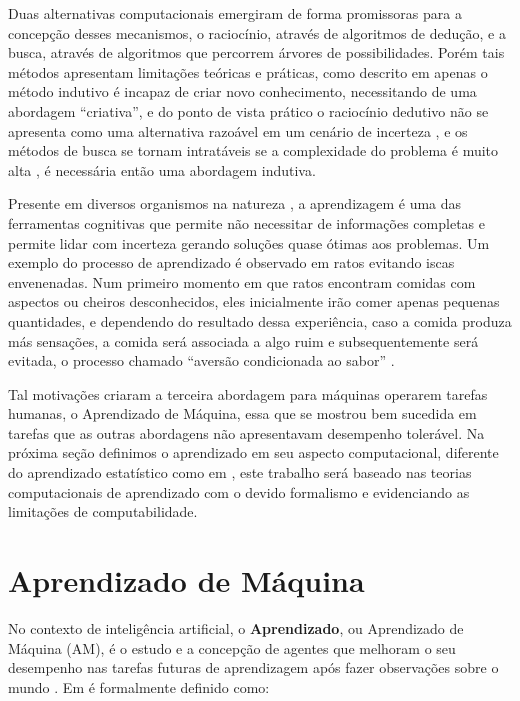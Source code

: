 Duas alternativas computacionais emergiram de forma promissoras para a concepção desses mecanismos, o raciocínio, através de algoritmos de dedução, e a busca, através de algoritmos que percorrem árvores de possibilidades. Porém tais métodos apresentam limitações teóricas e práticas, como descrito em \cite{popper2005logic} apenas o método indutivo é incapaz de criar novo conhecimento, necessitando de uma abordagem ``criativa'', e do ponto de vista prático o raciocínio dedutivo não se apresenta como uma alternativa razoável em um cenário de incerteza \cite{russell2016artificial}, e os métodos de busca se tornam intratáveis se a complexidade do problema é muito alta \cite{openai2019dota,Silver2016}, é necessária então uma abordagem indutiva.

Presente em diversos organismos na natureza \cite{shettleworth2001animal}, a aprendizagem é uma das ferramentas cognitivas que permite não necessitar de informações completas e permite lidar com incerteza gerando soluções quase ótimas aos problemas. Um exemplo do processo de aprendizado é observado em ratos evitando iscas envenenadas. Num primeiro momento em que ratos encontram comidas com aspectos ou cheiros desconhecidos, eles inicialmente irão comer apenas pequenas quantidades, e dependendo do resultado dessa experiência, caso a comida produza más sensações, a comida será associada a algo ruim e subsequentemente será evitada, o processo chamado ``aversão condicionada ao sabor'' \cite{garcia1955conditioned}.

Tal motivações criaram a terceira abordagem para máquinas operarem tarefas humanas, o Aprendizado de Máquina, essa que se mostrou bem sucedida em tarefas que as outras abordagens não apresentavam desempenho tolerável. Na próxima seção definimos o aprendizado em seu aspecto computacional, diferente do aprendizado estatístico como em \cite{friedman2001elements}, este trabalho será baseado nas teorias computacionais de aprendizado \cite{solomonoff1964formal,valiant1984theory,mohri2018foundations,bartlett2002rademacher,gold1967language,kearns1994introduction} com o devido formalismo e evidenciando as limitações de computabilidade.

\section{Aprendizado de Máquina}
\label{sec:aprendizado-de-maquina}

No contexto de inteligência artificial, o \textbf{Aprendizado}, ou Aprendizado de Máquina (AM), é o estudo e a concepção de agentes que melhoram o seu desempenho nas tarefas futuras de aprendizagem após fazer observações sobre o mundo \cite{russell2016artificial, mohri2018foundations}. Em \cite{mitchell1997machine} é formalmente definido como:

